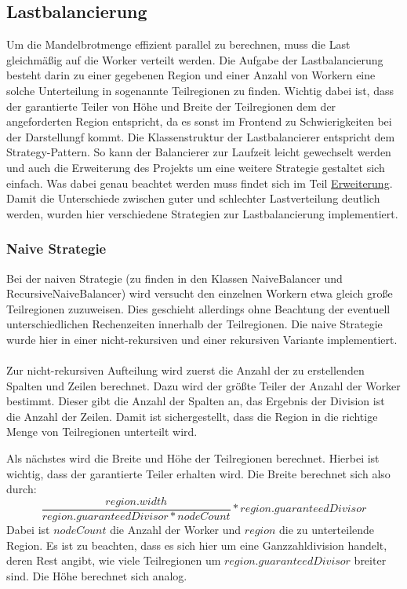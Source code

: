 \subsection{Lastbalancierung}
Um die Mandelbrotmenge effizient parallel zu berechnen, muss die Last gleichmäßig auf die Worker verteilt werden.
Die Aufgabe der Lastbalancierung besteht darin zu einer gegebenen Region und einer Anzahl von Workern eine solche Unterteilung in sogenannte Teilregionen zu finden.
Wichtig dabei ist, dass der garantierte Teiler von Höhe und Breite der Teilregionen dem der angeforderten Region entspricht, da es sonst im Frontend zu Schwierigkeiten bei der Darstellungf kommt.
Die Klassenstruktur der Lastbalancierer entspricht dem Strategy-Pattern. So kann der Balancierer zur Laufzeit leicht gewechselt werden und auch die Erweiterung des Projekts um eine weitere Strategie gestaltet sich einfach.
Was dabei genau beachtet werden muss findet sich im Teil \hyperref[lastbalancierung_erweiterung]{Erweiterung}.
\\
Damit die Unterschiede zwischen guter und schlechter Lastverteilung deutlich werden, wurden hier verschiedene Strategien zur Lastbalancierung implementiert.

\subsubsection{Naive Strategie}

Bei der naiven Strategie (zu finden in den Klassen NaiveBalancer und RecursiveNaiveBalancer) wird versucht den einzelnen Workern etwa gleich große Teilregionen zuzuweisen.
Dies geschieht allerdings ohne Beachtung der eventuell unterschiedlichen Rechenzeiten innerhalb der Teilregionen.
Die naive Strategie wurde hier in einer nicht-rekursiven  und einer rekursiven Variante implementiert.

\paragraph*{} \label{lastbalancierung_naiv}
Zur nicht-rekursiven Aufteilung wird zuerst die Anzahl der zu erstellenden Spalten und Zeilen berechnet.
Dazu wird der größte Teiler der Anzahl der Worker bestimmt. Dieser gibt die Anzahl der Spalten an, das Ergebnis der Division ist die Anzahl der Zeilen.
Damit ist sichergestellt, dass die Region in die richtige Menge von Teilregionen unterteilt wird.

Als nächstes wird die Breite und Höhe der Teilregionen berechnet. Hierbei ist wichtig, dass der garantierte Teiler erhalten wird.
Die Breite berechnet sich also durch:
\begin{equation*}
	\frac{region.width}{region.guaranteedDivisor * nodeCount} * region.guaranteedDivisor
\end{equation*}
Dabei ist $nodeCount$ die Anzahl der Worker und $region$ die zu unterteilende Region.
Es ist zu beachten, dass es sich hier um eine Ganzzahldivision handelt, deren Rest angibt, wie viele Teilregionen um $region.guaranteedDivisor$ breiter sind.
Die Höhe berechnet sich analog.

